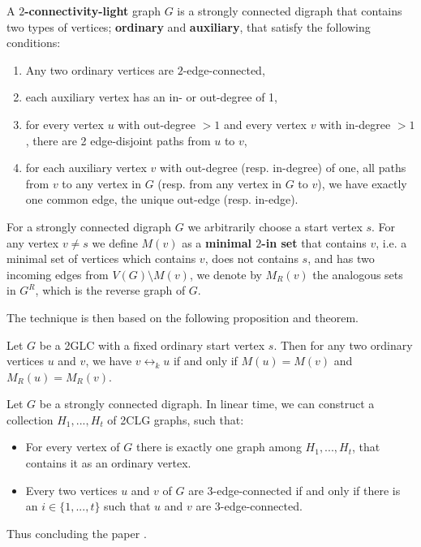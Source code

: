 \begin{definition}
    A \textbf{$2$-connectivity-light} graph $G$ is a strongly connected digraph that contains two types of vertices; \textbf{ordinary} and \textbf{auxiliary},
    that satisfy the following conditions:
    \begin{enumerate}
        \item Any two ordinary vertices are $2$-edge-connected,
        \item each auxiliary vertex has an in- or out-degree of 1,
        \item for every vertex $u$ with out-degree $>1$ and every vertex $v$ with in-degree $>1$, there are 2 edge-disjoint paths from $u$ to $v$,
        \item for each auxiliary vertex $v$ with out-degree (resp. in-degree) of one, all paths from $v$ to any vertex in $G$ (resp. from any vertex in $G$ to $v$),
        we have exactly one common edge, the unique out-edge (resp. in-edge).
    \end{enumerate}
\end{definition}

\begin{definition}
    For a strongly connected digraph $G$ we arbitrarily choose a start vertex $s$. For any vertex $v \neq s$ we define $M(v)$ as a \textbf{minimal $2$-in set} that contains $v$, i.e. a minimal set of vertices which contains $v$, does
    not contains $s$, and has two incoming edges from $V(G) \setminus M(v)$, we denote by $M_R(v)$ the analogous sets in $G^R$, which is the reverse graph of 
    $G$.
\end{definition}

The technique is then based on the following proposition and theorem.

\renewcommand{\theproposition}{I.3} 
\begin{proposition}
    Let $G$ be a 2GLC with a fixed ordinary start vertex $s$. Then for any two ordinary vertices $u$ and $v$, we have $v \leftrightarrow_k u$
    if and only if $M(u) = M(v)$ and $M_R(u) = M_R(v)$.
\end{proposition}
\renewcommand{\theproposition}{\arabic{proposition}}

\renewcommand{\thetheorem}{II.5} 
\begin{theorem}
    Let $G$ be a strongly connected digraph. In linear time, we can construct a collection $H_1, ..., H_t$ of 2CLG graphs, such that:
    \begin{itemize}
        \item For every vertex of $G$ there is exactly one graph among $H_1,..., H_t$, that contains it as an ordinary vertex.
        \item Every two vertices $u$ and $v$ of $G$ are $3$-edge-connected if and only if there is an $i \in \{1, ...,t\}$ such that $u$ and $v$
        are 3-edge-connected.
    \end{itemize}
\end{theorem}
\renewcommand{\thetheorem}{\arabic{theorem}}

Thus concluding the paper \cite{10756155}.